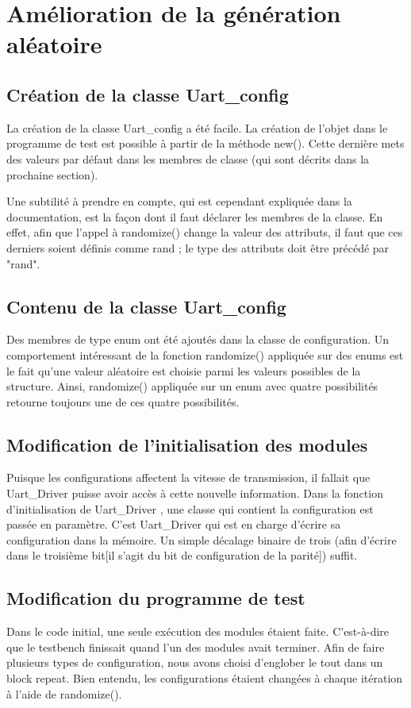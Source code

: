 \documentclass[12pt, titlepage]{article}
\newcommand{\udriver}{Uart\_Driver }
\newcommand{\uconfig}{Uart\_config }
\begin{document}
\section{Amélioration de la génération aléatoire} 
    \subsection{Création de la classe \uconfig} 
    La création de la classe \uconfig a été facile. La création de l'objet dans le programme de test est possible à partir de la méthode new(). Cette dernière mets des valeurs par défaut dans les membres de classe (qui sont décrits dans la prochaine section).

    Une subtilité à prendre en compte, qui est cependant expliquée dans la documentation, est la façon dont il faut déclarer les membres de la classe. En effet, afin que l'appel à randomize() change la valeur des attributs, il faut que ces derniers soient définis comme rand ; le type des attributs doit être précédé par "rand".
    
    \subsection{Contenu de la classe \uconfig}
    Des membres de type enum ont été ajoutés dans la classe de configuration. Un comportement intéressant de la fonction randomize() appliquée sur des enums est le fait qu'une valeur aléatoire est choisie parmi les valeurs possibles de la structure. Ainsi, randomize() appliquée sur un enum avec quatre possibilités retourne toujours une de ces quatre possibilités.
    \subsection{Modification de l'initialisation des modules} 
    Puisque les configurations affectent la vitesse de transmission, il fallait que \udriver puisse avoir accès à cette nouvelle information. Dans la fonction d'initialisation de \udriver, une classe qui contient la configuration est passée en paramètre. C'est \udriver qui est en charge d'écrire sa configuration dans la mémoire. Un simple décalage binaire de trois (afin d'écrire dans le troisième bit[il s'agit du bit de configuration de la parité]) suffit.

    
    \subsection{Modification du programme de test}
    Dans le code initial, une seule exécution des modules étaient faite. C'est-à-dire que le testbench finissait quand l'un des modules avait terminer. Afin de faire plusieurs types de configuration, nous avons choisi d'englober le tout dans un block repeat. Bien entendu, les configurations étaient changées à chaque itération à l'aide de randomize().
\end{document}

